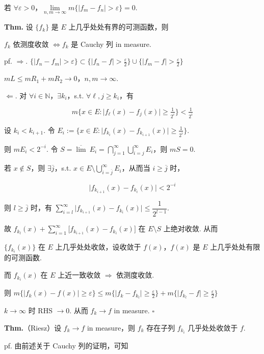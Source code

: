 \documentclass[11pt]{ctexart}
\theoremstyle{definition}
\begin{document}
若 $\forall \varepsilon > 0$，$\lim\limits_{n, m \to \infty} m\{\vert f_m - f_n\vert > \varepsilon\} = 0$.

\textbf{Thm.} 设 $\{f_k\}$ 是 $E$ 上几乎处处有界的可测函数，则

$f_k$ 依测度收敛 $\iff f_k$ 是 Cauchy 列 in measure.

pf. $\Rightarrow$. $\{\vert f_n - f_m\vert > \varepsilon\} \subset \{\vert f_n - f\vert > \tfrac{\varepsilon}{2}\} \cup \{\vert f_m - f\vert > \tfrac{\varepsilon}{2}\}$

$mL \leq mR_1 + mR_2 \to 0$，$n, m \to \infty$.

$\Leftarrow$. 对 $\forall i \in \mathbb{N}$，$\exists k_i$，s.t. $\forall \ell, j \geq k_i$，有

\[
m\{x \in E : \vert f_\ell(x) - f_j(x)\vert \geq \tfrac{1}{2^i}\} < \tfrac{1}{2^i}
\]

设 $k_i < k_{i+1}$. 令 $E_i := \{x \in E : \vert f_{k_i}(x) - f_{k_{i+1}}(x)\vert \geq \tfrac{1}{2^i}\}$.

则 $mE_i < 2^{-i}$. 令 $S = \overline{\lim}\ E_i = \bigcap\limits_{j=1}^{\infty} \bigcup\limits_{i=j}^{\infty} E_i$，则 $mS = 0$.

若 $x \notin S$，则 $\exists \overline{j}$，s.t. $x \in E \setminus \bigcup\limits_{i=\overline{j}}^{\infty} E_i$，从而当 $i \geq \overline{j}$ 时，

\[
\vert f_{k_{i+1}}(x) - f_{k_i}(x)\vert < 2^{-i}
\]

则 $l \geq \overline{j}$ 时，有 $\sum\limits_{i=l}^{\infty} \vert f_{k_{i+1}}(x) - f_{k_i}(x)\vert \leq \dfrac{1}{2^{l-1}}$.

故 $f_{k_l}(x) + \sum\limits_{i=1}^{\infty} \big[f_{k_{i+1}}(x) - f_{k_i}(x)\big]$ 在 $E \setminus S$ 上绝对收敛. 从而

$\{f_{k_i}(x)\}$ 在 $E$ 上几乎处处收敛，设收敛于 $f(x)$，$f(x)$ 是 $E$ 上几乎处处有限的可测函数.

而 $f_{k_i}(x)$ 在 $E$ 上近一致收敛 $\Rightarrow$ 依测度收敛.

则 $m\{\vert f_k(x) - f(x)\vert \geq \varepsilon\} \leq m\{\vert f_k - f_{k_l}\vert \geq \tfrac{\varepsilon}{2}\} + m\{\vert f_{k_l} - f\vert \geq \tfrac{\varepsilon}{2}\}$

$k \to \infty$ 时 RHS $\to 0$. 从而 $f_k \to f$ in measure. $\square$

\textbf{Thm.}（Riesz）设 $f_k \to f$ in measure，则 $f_k$ 存在子列 $f_{k_i}$ 几乎处处收敛于 $f$.

pf. 由前述关于 Cauchy 列的证明，可知
\end{document}
